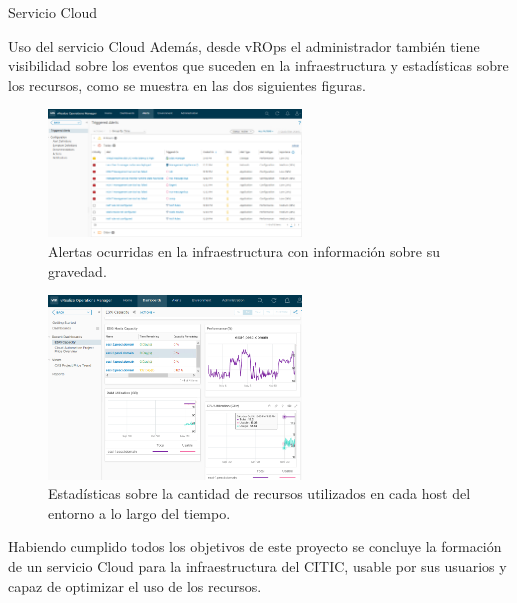 \begin{subsection}{Servicio Cloud}
\begin{subsubsection}{Uso del servicio Cloud}
        Además, desde vROps el administrador también tiene visibilidad sobre los eventos que suceden en la infraestructura y estadísticas sobre los recursos, como se muestra en las dos siguientes figuras.
        \begin{figure}[h]
            \centering
            \includegraphics[width=0.6\textwidth]{imaxes/pruebaconcepto/vrealize/vrops-alerts.png}
            \caption{Alertas ocurridas en la infraestructura con información sobre su gravedad.}
            \label{fig:vrops-alerts}
        \end{figure}
        \FloatBarrier
        \begin{figure}[h]
            \centering
            \includegraphics[width=0.6\textwidth]{imaxes/pruebaconcepto/vrealize/vrops-statistics.png}
            \caption{Estadísticas sobre la cantidad de recursos utilizados en cada host del entorno a lo largo del tiempo.}
            \label{fig:vrops-statistics}
        \end{figure}
        \FloatBarrier

        Habiendo cumplido todos los objetivos de este proyecto se concluye la formación de un servicio Cloud para la infraestructura del CITIC, usable por sus usuarios y capaz de optimizar el uso de los recursos.
    \end{subsubsection}
    

\end{subsection}
